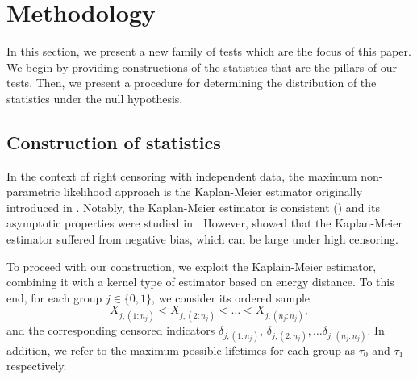 \documentclass[11pt]{article}
\begin{document}
	
\section{Methodology}
\label{estadisticos}

In this  section,  we present  a new family of tests which are the   focus of this paper. We begin by providing  constructions of the statistics  that are the pillars of our tests. Then, we present  a procedure  for determining the  distribution of the statistics under the null  hypothesis.

\subsection{Construction of statistics}
\label{tiempos}

In the context of right censoring with independent  data, the maximum non-parametric 
likelihood approach is the Kaplan-Meier  estimator  originally introduced in \cite{kaplan1958nonparametric}. Notably, the Kaplan-Meier  estimator is consistent (\cite{wang1987note}) and  its  asymptotic  properties were studied in  \cite{cai1998asymptotic}.  However, \cite{stute1994bias}  showed that the Kaplan-Meier estimator  suffered from negative  bias, which can be  large under high censoring.%


To proceed with our  construction,  we  exploit  the Kaplain-Meier  estimator,  combining it  with a  kernel type of estimator  based on energy distance. To this end,
for each group $j \in \{0,1\}$, we consider its ordered sample $$X_{j,(1:n_j)}  <  X_{j,(2:n_j)}<\dots <X_{j,(n_j:n_j)},$$
and  the corresponding censored indicators $\delta_{j,(1:n_j)}$, $\delta_{j,(2:n_j)},\dots \delta_{j,(n_j:n_j)}$. In addition, we refer to the maximum possible lifetimes  for each group as  $\tau_0$ and $\tau_1$ respectively.


\end{document}
